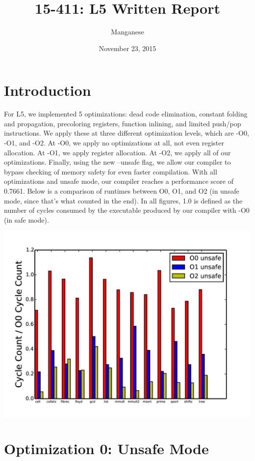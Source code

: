 \documentclass{article}
\title{15-411: L5 Written Report}
\author{Manganese}
\date{November 23, 2015}
\begin{document}
\maketitle

\section{Introduction}

For L5, we implemented 5 optimizations: dead code elimination, constant folding and propagation, precoloring registers, function inlining, and limited push/pop instructions. We apply these at three different optimization levels, which are -O0, -O1, and -O2. At -O0, we apply no optimizations at all, not even register allocation. At -O1, we apply register allocation. At -O2, we apply all of our optimizations. Finally, using the new --unsafe flag, we allow our compiler to bypass checking of memory safety for even faster compilation. With all optimizations and unsafe mode, our compiler reaches a performance score of 0.7661. Below is a comparison of runtimes between O0, O1, and O2 (in unsafe mode, since that's what counted in the end). In all figures, 1.0 is defined as the number of cycles consumed by the executable produced by our compiler with -O0 (in safe mode).

\includegraphics[scale=0.5]{O0-O1-O2_unsafe-page-001}

\section{Optimization 0: Unsafe Mode}
\end{document}
